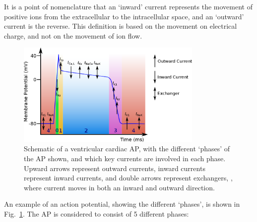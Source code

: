 \documentclass[../thesis-main.tex]{subfiles}
\begin{document}
 It is a point of nomenclature that an `inward' current represents the movement of positive ions from the extracellular to the intracellular space, and an `outward' current is the reverse. This definition is based on the movement on electrical charge, and not on the movement of ion flow.
 
 \begin{figure}
  \centering
  \includegraphics[width=0.8\textwidth]{ap-structure-full}
  \caption[Schematic of a cardiac AP]{Schematic of a ventricular cardiac AP, with the different `phases' of the AP shown, and which key currents are involved in each phase. Upward arrows represent outward currents, inward currents represent inward currents, and double arrows represent exchangers, \idest, where current moves in both an inward and outward direction.}
  \label{fig:ap-structure}
 \end{figure}
 An example of an action potential, showing the different `phases', is shown in Fig.~\ref{fig:ap-structure}. The AP is considered to consist of 5 different phases:
\end{document}
